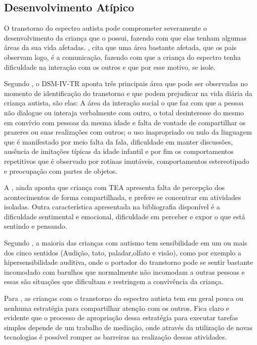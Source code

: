 	\subsection{Desenvolvimento Atípico}
	O transtorno do espectro autista pode comprometer severamente o desenvolvimento da criança que o possui, fazendo com que elas tenham algumas áreas da sua vida afetadas. , cita que uma área  bastante afetada, que os pais observam logo, é a comunicação, fazendo com que a criança do espectro tenha dificuldade na interação com os outros e que por esse motivo, se isole. 
	
	Segundo , o DSM-IV-TR aponta três principais área que pode ser observadas no momento de identificação do transtorno e que podem prejudicar na vida diária da criança autista, são elas: A área da interação social o que faz com que a pessoa não dialogue ou interaja verbalmente com outro, o total desinteresse do mesmo em convívio com pessoas da mesma idade e falta de vontade de compartilhar os prazeres ou suas realizações com outros; o uso inapropriado ou nulo da linguagem que é manifestado por meio falta da fala, dificuldade em manter discussões, ausência de imitações típicas da idade infantil e por fim os comportamentos repetitivos que é observado por rotinas imutáveis, comportamentos estereotipado e preocupação com partes de objetos.
	
	A  , ainda aponta que criança com TEA apresenta falta de percepção dos acontecimentos de forma compartilhada, e prefere se concentrar em atividades isoladas. Outra característica apresentada na bibliografia disponível é a dificuldade sentimental e emocional, dificuldade em perceber e expor o que está sentindo e pensando. 
	
	Segundo , a maioria das crianças com autismo tem sensibilidade em um ou mais dos cinco sentidos (Audição, tato, paladar,olfato e visão), como por exemplo a hipersensibilidade auditiva, onde o portador do transtorno pode se sentir bastante incomodado com barulhos que normalmente não incomodam a outras pessoas e essas são situações que dificultam e restringem a convivência da criança.

	Para , as crianças com o transtorno do espectro autista tem em geral pouca ou nenhuma estratégia para compartilhar atenção com os outros. Fica claro e evidente que o processo de apropriação dessa estratégia para executar tarefas simples depende de um trabalho de mediação, onde através da utilização de novas tecnologias é possível romper as barreiras na realização dessas atividades.
	
